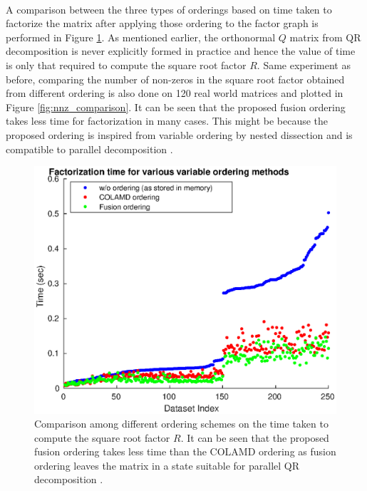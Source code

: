 \paragraph{}
A comparison between the three types of orderings based on time taken to factorize the matrix after applying those ordering to the factor graph is performed in Figure \ref{fig:factorization_time}. As mentioned earlier, the orthonormal $Q$ matrix from QR decomposition is never explicitly formed in practice and hence the value of time is only that required to compute the square root factor $R$. Same experiment as before, comparing the number of non-zeros in the square root factor obtained from different ordering is also done on 120 real world matrices and plotted in Figure \ref{fig:nnz_comparison}. It can be seen that the proposed fusion ordering takes less time for factorization in many cases. This might be because the proposed ordering is inspired from variable ordering  by nested dissection and is compatible to parallel decomposition \cite{parallelqr}.
\begin{figure}[!]
\includegraphics[width=\textwidth, height=0.4\textheight]{Chapters/figures3/factorization_time_comparison}
\caption{Comparison among different ordering schemes on the time taken to compute the square root factor $R$. It can be seen that the proposed fusion ordering takes less time than the COLAMD ordering as fusion ordering leaves the matrix in a state suitable for parallel QR decomposition \cite{parallelqr}.}
\label{fig:factorization_time}
\end{figure}
